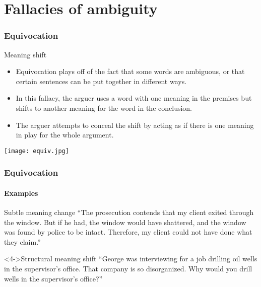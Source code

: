 \documentclass[10pt,letterpaper,xcolor=dvipsnames]{beamer}
\begin{document}
\section{Fallacies of ambiguity}

\begin{frame}
  \frametitle{Equivocation}
  
  \begin{block}{Meaning shift}
    \begin{itemize}
      \item Equivocation plays off of the fact that some words are ambiguous, or that certain sentences can be put together in different ways.
      \item In this fallacy, the arguer uses a word with one meaning in the premises but shifts to another meaning for the word in the conclusion.
      \item The arguer attempts to conceal the shift by acting as if there is one meaning in play for the whole argument.
    \end{itemize}
  \end{block}
  
  
  \begin{center}
    \texttt{[image: equiv.jpg]}
  \end{center}
  
\end{frame}

\begin{frame}
  \frametitle{Equivocation}
  \framesubtitle{Examples}
  
  \begin{block}{Subtle meaning change}
    ``The prosecution contends that my client exited through the window. But if he had, the window\uncover<3->{$_{pane}$} would have shattered, and the window was found by police to be intact. Therefore, my client could not have done what they claim.''
  \end{block}
  
    \begin{block}<4->{Structural meaning shift}
    ``George was \alert<5-5>{interviewing} for a \alert<6->{job} drilling oil wells \alert<5->{in the supervisor's office}.  That company is so disorganized.  Why would you drill wells in the supervisor's office?''
  \end{block}
  
\end{frame}
\end{document}

